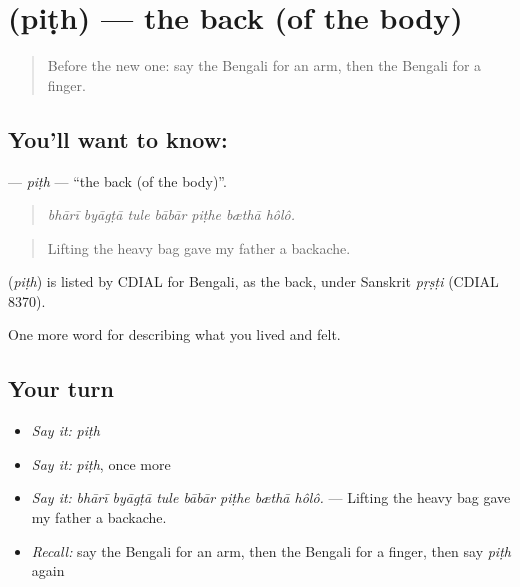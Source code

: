 \section[\texorpdfstring{\bn{পিঠ} (piṭh)}{পিঠ (piṭh)}]{ (piṭh) — the back (of the body)}

\label{lesson:BN-C466-pith}



\begin{quote}
Before the new one: say the Bengali for an arm, then the Bengali for a finger.
\end{quote}

\subsection*{You'll want to know: }
\textbf{} — \emph{piṭh} — \textquotedblleft{}the back (of the body)\textquotedblright{}.

\begin{quote}
      
\end{quote}

\begin{quote}
\emph{bhārī byāgṭā tule bābār piṭhe bæthā hôlô.}
\end{quote}

\begin{quote}
Lifting the heavy bag gave my father a backache.
\end{quote}

\begin{cousinweb}
\textbf{} (\emph{piṭh}) is listed by CDIAL for Bengali, as the back, under Sanskrit \emph{pṛṣṭi} (CDIAL 8370).
\end{cousinweb}

\begin{grammarlens}[title={What you've built}]
One more word for describing what you lived and felt.
\end{grammarlens}

\subsection*{Your turn}
\begin{itemize}
\raggedright
  \item \emph{Say it:} \emph{piṭh}
  \item \emph{Say it:} \emph{piṭh}, once more
  \item \emph{Say it:} \emph{bhārī byāgṭā tule bābār piṭhe bæthā hôlô.} — Lifting the heavy bag gave my father a backache.
  \item \emph{Recall:} say the Bengali for an arm, then the Bengali for a finger, then say \emph{piṭh} again
\end{itemize}

